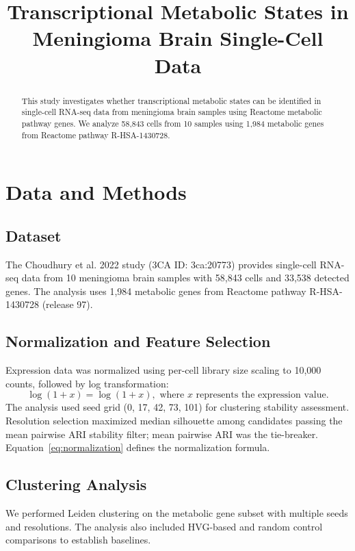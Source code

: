 \documentclass[sloppy]{article}
\title{Transcriptional Metabolic States in Meningioma Brain Single-Cell Data}
\author{}
\date{}
\begin{document}
\sloppy

\maketitle

\begin{abstract}
This study investigates whether transcriptional metabolic states can be identified in single-cell RNA-seq data from meningioma brain samples using Reactome metabolic pathway genes. We analyze 58,843 cells from 10 samples using 1,984 metabolic genes from Reactome pathway R-HSA-1430728.
\end{abstract}

\section{Data and Methods}

\subsection{Dataset}
The Choudhury et al. 2022 study (3CA ID: 3ca:20773) provides single-cell RNA-seq data from 10 meningioma brain samples with 58,843 cells and 33,538 detected genes. The analysis uses 1,984 metabolic genes from Reactome pathway R-HSA-1430728 (release 97).

\subsection{Normalization and Feature Selection}
Expression data was normalized using per-cell library size scaling to 10,000 counts, followed by log transformation:
\begin{equation}
\label{eq:normalization}
\log(1+x) = \log(1+x), \text{ where } x \text{ represents the expression value.}
\end{equation}
The analysis used seed grid (0, 17, 42, 73, 101) for clustering stability assessment. Resolution selection maximized median silhouette among candidates passing the mean pairwise ARI stability filter; mean pairwise ARI was the tie-breaker. Equation~\ref{eq:normalization} defines the normalization formula.

\subsection{Clustering Analysis}
We performed Leiden clustering on the metabolic gene subset with multiple seeds and resolutions. The analysis also included HVG-based and random control comparisons to establish baselines.
\end{document}
